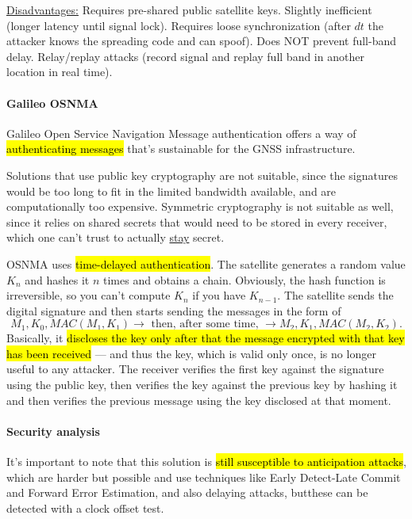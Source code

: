 \underline{Disadvantages:}
Requires pre-shared public satellite keys.
Slightly inefficient (longer latency until signal lock).
Requires loose synchronization (after $dt$ the attacker knows the spreading code and can spoof).
Does NOT prevent full-band delay.
Relay/replay attacks (record signal and replay full band in another location in real time).

\paragraph{Galileo OSNMA}
Galileo Open Service Navigation Message authentication offers a way of
\hl{authenticating messages} that's sustainable for the GNSS infrastructure.

Solutions that use public key cryptography are not suitable, since the
signatures would be too long to fit in the limited bandwidth available, and are
computationally too expensive. Symmetric cryptography is not suitable as well,
since it relies on shared secrets that would need to be stored in every
receiver, which one can't trust to actually \underline{stay} secret.

OSNMA uses \hl{time-delayed authentication}. The satellite generates a random
value $K_n$ and hashes it $n$ times and obtains a chain. Obviously, the hash
function is irreversible, so you can't compute $K_n$ if you have $K_{n-1}$. The
satellite sends the digital signature and then starts sending the messages in
the form of \[ M_1, K_0,MAC(M_1, K_1)\rightarrow \text{ then, after some time, }
	\rightarrow M_2, K_1,MAC(M_2, K_2).\]
Basically, it \hl{discloses the key only after that the message encrypted with that key
	has been received} --- and thus the key, which is valid only once, is no longer
useful to any attacker. The receiver verifies the first key against the
signature using the public key, then verifies the key against the previous key
by hashing it and then verifies the previous message using the key disclosed at
that moment.

\paragraph{Security analysis}
It's important to note that this solution is \hl{still susceptible to anticipation
	attacks}, which are harder but possible and use techniques like Early Detect-Late Commit and Forward Error Estimation, and also delaying attacks, butthese can be detected with a clock offset test.
